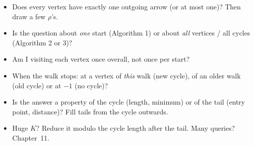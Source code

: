 \begin{checklistbox}
\begin{itemize}[leftmargin=*]
    \item[$\square$] Does every vertex have exactly one outgoing arrow (or at most one)? Then draw a few $\rho$'s.
    \item[$\square$] Is the question about \emph{one} start (Algorithm 1) or about \emph{all} vertices / all cycles (Algorithm 2 or 3)?
    \item[$\square$] Am I visiting each vertex once overall, not once per start?
    \item[$\square$] When the walk stops: at a vertex of \emph{this} walk (new cycle), of an older walk (old cycle) or at $-1$ (no cycle)?
    \item[$\square$] Is the answer a property of the cycle (length, minimum) or of the tail (entry point, distance)? Fill tails from the cycle outwards.
    \item[$\square$] Huge $K$? Reduce it modulo the cycle length after the tail. Many queries? Chapter~11.
\end{itemize}
\end{checklistbox}
